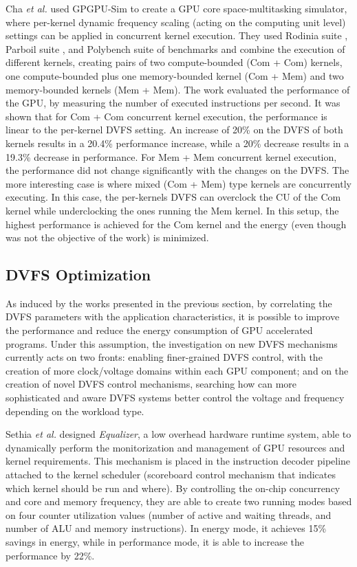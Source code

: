 Cha \textit{et al.} \cite{cha_core-level_2018} used GPGPU-Sim to create a GPU core space-multitasking simulator, where per-kernel dynamic frequency scaling (acting on the computing unit level) settings can be applied in concurrent kernel execution. They used Rodinia suite \cite{che_rodinia:_2009}, Parboil suite \cite{stratton_parboil:_nodate}, and Polybench suite \cite{noauthor_polybench/c_nodate} of benchmarks and combine the execution of different kernels, creating pairs of two compute-bounded (Com + Com) kernels, one compute-bounded plus one memory-bounded kernel (Com + Mem) and two memory-bounded kernels (Mem + Mem). The work evaluated the performance of the GPU, by measuring the number of executed instructions per second. It was shown that for Com + Com concurrent kernel execution, the performance is linear to the per-kernel DVFS setting. An increase of 20\% on the DVFS of both kernels results in a 20.4\% performance increase, while a 20\% decrease results in a 19.3\% decrease in performance. For Mem + Mem concurrent kernel execution, the performance did not change significantly with the changes on the DVFS. The more interesting case is where mixed (Com + Mem) type kernels are concurrently executing. In this case, the per-kernels DVFS can overclock the CU of the Com kernel while underclocking the ones running the Mem kernel. In this setup, the highest performance is achieved for the Com kernel and the energy (even though was not the objective of the work) is minimized.

\subsection{DVFS Optimization}

As induced by the works presented in the previous section, by correlating the DVFS parameters with the application characteristics, it is possible to improve the performance and reduce the energy consumption of GPU accelerated programs. Under this assumption, the investigation on new DVFS mechanisms currently acts on two fronts: enabling finer-grained DVFS control, with the creation of more clock/voltage domains within each GPU component; and on the creation of novel DVFS control mechanisms, searching how can more sophisticated and aware DVFS systems better control the voltage and frequency depending on the workload type.

Sethia \textit{et al.} \cite{sethia_equalizer:_2014} designed \textit{Equalizer}, a low overhead hardware runtime system, able to dynamically perform the monitorization and management of GPU resources and kernel requirements. This mechanism is placed in the instruction decoder pipeline attached to the kernel scheduler (scoreboard control mechanism that indicates which kernel should be run and where). By controlling the on-chip concurrency and core and memory frequency, they are able to create two running modes based on four counter utilization values (number of active and waiting threads, and number of ALU and memory instructions). In energy mode, it achieves 15\% savings in energy, while in performance mode, it is able to increase the performance by 22\%.

